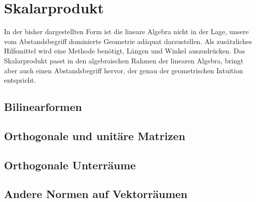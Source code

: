 %
%
%
\section{Skalarprodukt
\label{buch:section:skalarprodukt}}
In der bisher dargestellten Form ist die lineare Algebra nicht
in der Lage, unsere vom Abstandsbegriff dominierte Geometrie adäquat
darzustellen.
Als zusätzliches Hilfsmittel wird eine Methode benötigt, Längen
und Winkel auszudrücken.
Das Skalarprodukt passt in den algebraischen Rahmen der
linearen Algebra, bringt aber auch einen Abstandsbegriff hervor,
der genau der geometrischen Intuition entspricht.

\subsection{Bilinearformen
\label{buch:subsection:bilinearformen}}

\subsection{Orthogonale und unitäre Matrizen
\label{buch:subsection:orthogonale-und-unitaere-matrizen}}

\subsection{Orthogonale Unterräume
\label{buch:subsection:orthogonale-unterraeume}}

\subsection{Andere Normen auf Vektorräumen
\label{buch:subsection:andere-normen}}
